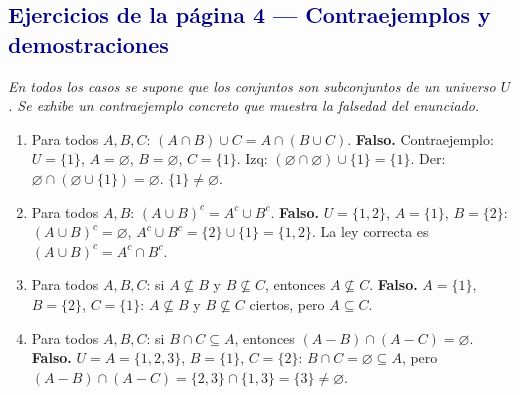 \documentclass[12pt,a4paper]{article}
\newcommand{\propbox}[1]{\noindent\textcolor{muted}{\small\textit{#1}}\par}
\begin{document}
\subsection*{\textcolor{navy}{Ejercicios de la página 4 — Contraejemplos y demostraciones}}

\propbox{En todos los casos se supone que los conjuntos son subconjuntos de un universo $U$. Se exhibe un contraejemplo concreto que muestra la falsedad del enunciado.}

\begin{enumerate}[label=\arabic*.]
  \item Para todos $A,B,C$: $(A\cap B)\cup C=A\cap(B\cup C)$. \textbf{Falso.} Contraejemplo: $U=\{1\}$, $A=\varnothing$, $B=\varnothing$, $C=\{1\}$. Izq: $(\varnothing\cap\varnothing)\cup\{1\}=\{1\}$. Der: $\varnothing\cap(\varnothing\cup\{1\})=\varnothing$. $\{1\}\neq\varnothing$.
  \item Para todos $A,B$: $(A\cup B)^c=A^c\cup B^c$. \textbf{Falso.} $U=\{1,2\}$, $A=\{1\}$, $B=\{2\}$: $(A\cup B)^c=\varnothing$, $A^c\cup B^c=\{2\}\cup\{1\}=\{1,2\}$. La ley correcta es $(A\cup B)^c=A^c\cap B^c$.
  \item Para todos $A,B,C$: si $A\not\subseteq B$ y $B\not\subseteq C$, entonces $A\not\subseteq C$. \textbf{Falso.} $A=\{1\}$, $B=\{2\}$, $C=\{1\}$: $A\not\subseteq B$ y $B\not\subseteq C$ ciertos, pero $A\subseteq C$.
  \item Para todos $A,B,C$: si $B\cap C\subseteq A$, entonces $(A-B)\cap(A-C)=\varnothing$. \textbf{Falso.} $U=A=\{1,2,3\}$, $B=\{1\}$, $C=\{2\}$: $B\cap C=\varnothing\subseteq A$, pero $(A-B)\cap(A-C)=\{2,3\}\cap\{1,3\}=\{3\}\neq\varnothing$.
\end{enumerate}
\end{document}
